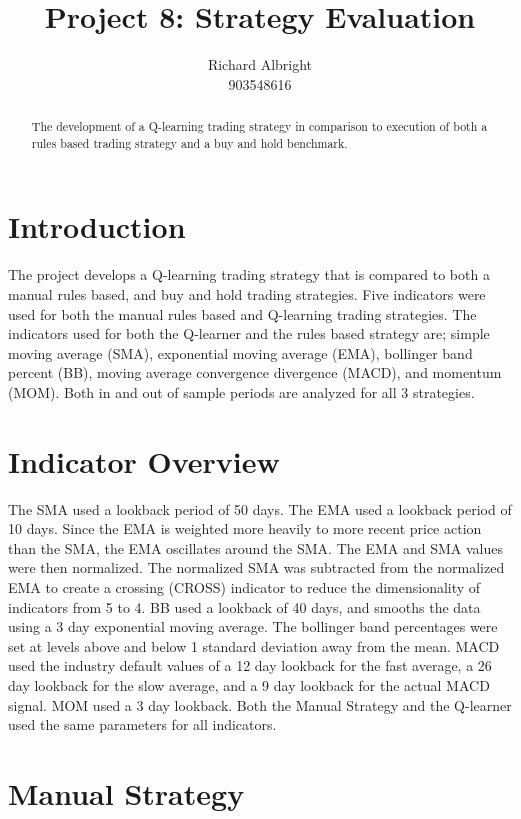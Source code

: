 \documentclass[
	letterpaper, %
]{jdf}
\author{
	Richard Albright \\
	903548616}
\title{Project 8: Strategy Evaluation}
\begin{document}

\maketitle

\begin{abstract}
The development of a Q-learning trading strategy in comparison to execution of both a rules based trading strategy and a buy and hold benchmark.
\end{abstract}

\section{Introduction}
The project develops a Q-learning trading strategy that is compared to both a manual rules based, and buy and hold trading strategies.  Five indicators were used for both the manual rules based and Q-learning trading strategies.  The indicators used for both the Q-learner and the rules based strategy are; simple moving average (SMA), exponential moving average (EMA), bollinger band percent (BB), moving average convergence divergence (MACD), and momentum (MOM).  Both in and out of sample periods are analyzed for all 3 strategies. 

\section{Indicator Overview}


The SMA used a lookback period of 50 days.  The EMA used a lookback period of 10 days. Since the EMA is weighted more heavily to more recent price action than the SMA, the EMA oscillates around the SMA. The EMA and SMA values were then normalized.  The normalized SMA was subtracted from the normalized EMA to create a crossing (CROSS) indicator to reduce the dimensionality of indicators from 5 to 4.  BB used a lookback of 40 days, and smooths the data using a 3 day exponential moving average.  The bollinger band percentages were set at levels above and below 1 standard deviation away from the mean.  MACD used the industry default values of a 12 day lookback for the fast average, a 26 day lookback for the slow average, and a 9 day lookback for the actual MACD signal. MOM used a 3 day lookback. Both the Manual Strategy and the Q-learner used the same parameters for all indicators.


\section{Manual Strategy}
\end{document}
